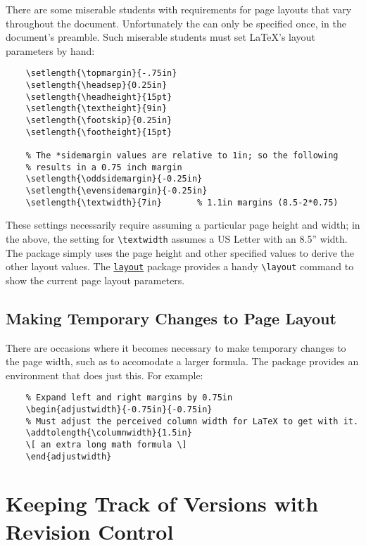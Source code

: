There are some miserable students with requirements for page layouts
that vary throughout the document.  Unfortunately the
 can only be specified once, in the document's
preamble.  Such miserable students must set \LaTeX's layout parameters
by hand:
\begin{lstlisting}
    \setlength{\topmargin}{-.75in}
    \setlength{\headsep}{0.25in}
    \setlength{\headheight}{15pt}
    \setlength{\textheight}{9in}
    \setlength{\footskip}{0.25in}
    \setlength{\footheight}{15pt}

    % The *sidemargin values are relative to 1in; so the following
    % results in a 0.75 inch margin
    \setlength{\oddsidemargin}{-0.25in}
    \setlength{\evensidemargin}{-0.25in}
    \setlength{\textwidth}{7in}       % 1.1in margins (8.5-2*0.75)
\end{lstlisting}
These settings necessarily require assuming a particular page height
and width; in the above, the setting for \verb+\textwidth+ assumes
a \textsc{US} Letter with an 8.5'' width.
The  package simply uses the page height and
other specified values to derive the other layout values.
The
\href{http://tug.ctan.org/tex-archive/macros/latex/required/tools/layout.pdf}{\texttt{layout}}
package provides a
handy \verb+\layout+ command to show the current page layout
parameters. 


\subsection{Making Temporary Changes to Page Layout}

There are occasions where it becomes necessary to make temporary
changes to the page width, such as to accomodate a larger formula. 
The  package provides an 
environment that does just this.  For example:
\begin{lstlisting}
    % Expand left and right margins by 0.75in
    \begin{adjustwidth}{-0.75in}{-0.75in}
    % Must adjust the perceived column width for LaTeX to get with it.
    \addtolength{\columnwidth}{1.5in}
    \[ an extra long math formula \]
    \end{adjustwidth}
\end{lstlisting}


\section{Keeping Track of Versions with Revision Control}
\label{sec:DissertationRevisionControl}

